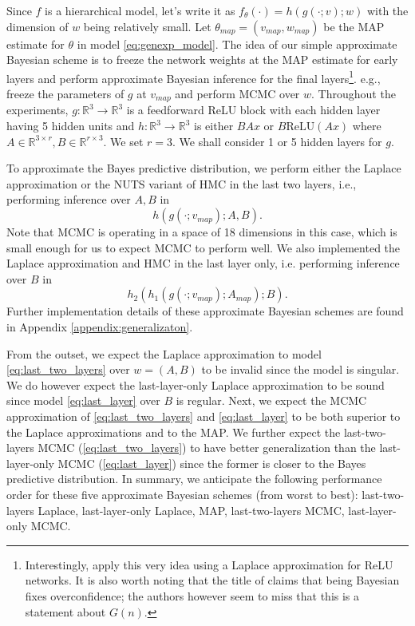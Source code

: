 \documentclass{article} %
\begin{document}
 Since $f$ is a hierarchical model, let's write it as $f_\theta(\cdot) = h(g(\cdot;v);w)$ with the dimension of $w$ being relatively small. Let $\theta_{map} = (v_{map}, w_{map})$ be the MAP estimate for $\theta$ in model \ref{eq:genexp_model}. The idea of our simple approximate Bayesian scheme is to freeze the network weights at the MAP estimate for early layers and perform approximate Bayesian inference for the final layers\footnote{Interestingly, \citet{kristiadi_being_2020} apply this very idea using a Laplace approximation for ReLU networks. It is also worth noting that the title of \citet{kristiadi_being_2020} claims that being Bayesian fixes overconfidence; the authors however seem to  miss that this is a statement  about $G(n)$.}. e.g., freeze the parameters of $g$ at $v_{map}$ and perform MCMC over $w$. 
Throughout the experiments, $g: \mathbb R^3 \to \mathbb R^3$ is a feedforward ReLU block with each hidden layer having 5 hidden units and $h: \mathbb R^3 \to \mathbb R^3$ is either $BAx$ or $B\text{ReLU}(Ax)$ where $A \in \mathbb R^{3 \times r}, B \in \mathbb R^{r \times 3}$. We set $r=3$. We shall consider 1 or 5 hidden layers for $g$. 

To approximate the Bayes predictive distribution, we perform either the Laplace approximation or the NUTS variant of HMC \citep{hoffman2014no} in the last two layers, i.e., performing inference over $A,B$ in
\begin{equation}
h(g(\cdot;v_{map});A,B).
\label{eq:last_two_layers}
\end{equation}
Note that MCMC is operating in a space of 18 dimensions in this case, which is small enough for us to expect MCMC to perform well.
We also implemented the Laplace approximation and HMC in the last layer only, i.e. performing inference over $B$ in
\begin{equation}
h_2(h_1(g(\cdot;v_{map});A_{map}); B).
\label{eq:last_layer}
\end{equation}
Further implementation details of these approximate Bayesian schemes are found in Appendix \ref{appendix:generalizaton}.


From the outset, we expect the Laplace approximation to model \ref{eq:last_two_layers} over $w = (A, B)$ to be invalid since the model is singular. We do however expect the last-layer-only Laplace approximation to be sound since model \ref{eq:last_layer} over $B$ is regular. Next, we expect the MCMC approximation of \eqref{eq:last_two_layers} and \eqref{eq:last_layer} to be both superior to the Laplace approximations and to the MAP. We further expect the last-two-layers MCMC (\eqref{eq:last_two_layers}) to have better generalization than the last-layer-only MCMC (\eqref{eq:last_layer}) since the former is closer to the Bayes predictive distribution. In summary, we anticipate the following performance order for these five approximate Bayesian schemes (from worst to best): last-two-layers Laplace, last-layer-only Laplace, MAP, last-two-layers MCMC, last-layer-only MCMC.
\end{document}

